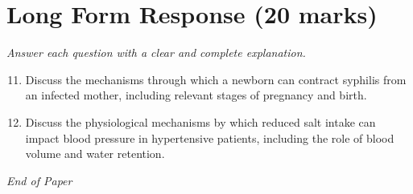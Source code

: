\documentclass[12pt]{article}
\begin{document}
\section*{Long Form Response (20 marks)}
\textit{Answer each question with a clear and complete explanation.}
\begin{enumerate}[label=\arabic*.]
\setcounter{enumi}{10}
\item Discuss the mechanisms through which a newborn can contract syphilis from an infected mother, including relevant stages of pregnancy and birth.
\item Discuss the physiological mechanisms by which reduced salt intake can impact blood pressure in hypertensive patients, including the role of blood volume and water retention.
\end{enumerate}

\vfill
\noindent\textit{End of Paper}
\end{document}
